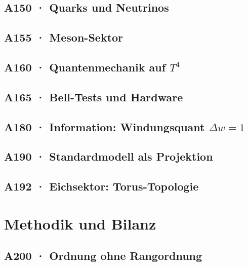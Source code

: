 \documentclass[11pt,twoside,openright]{book}
\begin{document}
\chapter[A150 · Quarks und Neutrinos]{A150 · Quarks und Neutrinos}


\chapter[A155 · Meson-Sektor]{A155 · Meson-Sektor}


\chapter[A160 · Quantenmechanik auf $T^4$]{A160 · Quantenmechanik auf $T^4$}


\chapter[A165 · Bell-Tests und Hardware]{A165 · Bell-Tests und Hardware}


\chapter[A180 · Information]{A180 · Information: Windungsquant $\Delta w=1$}


\chapter[A190 · Standardmodell als Projektion]{A190 · Standardmodell als Projektion}


\chapter[A192 · Eichsektor]{A192 · Eichsektor: Torus-Topologie}


\part{Methodik und Bilanz}

\chapter[A200 · Ordnung ohne Rangordnung]{A200 · Ordnung ohne Rangordnung}

\end{document}
